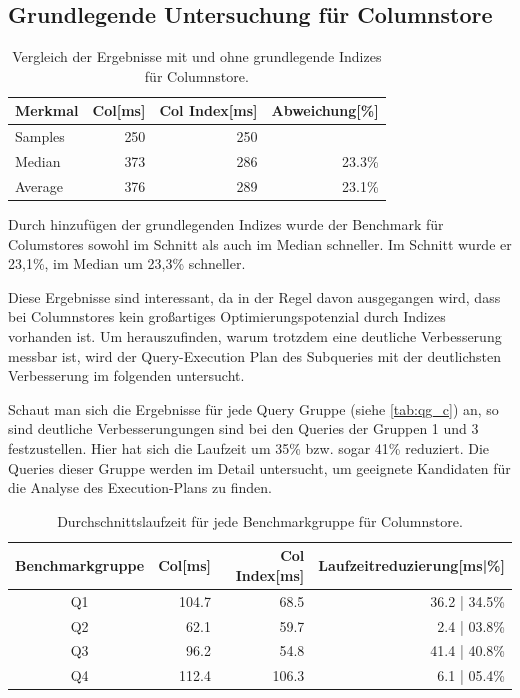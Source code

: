 \subsection{Grundlegende Untersuchung für Columnstore}
\begin{table}[H]
\centering
    \begin{tabularx}{\textwidth}{lrrr}
        \toprule
        Merkmal             &   Col[ms]    &    Col Index[ms] & Abweichung[\%]\\
        \toprule
        Samples             &   250        &   250      &       \\
        \midrule    
        Median              &   373        &   286      & 23.3\%\\
        Average             &   376        &   289      & 23.1\%\\
        \bottomrule
    \end{tabularx}
\caption{Vergleich der Ergebnisse mit und ohne grundlegende Indizes für Columnstore.}
\label{tab:basic_index_col}
\end{table}

Durch hinzufügen der grundlegenden Indizes wurde der Benchmark
für Columstores sowohl im Schnitt als auch im Median schneller.
Im Schnitt wurde er 23,1\%, im Median um 23,3\% schneller.

Diese Ergebnisse sind interessant, da in der Regel davon ausgegangen wird, 
dass bei Columnstores kein großartiges Optimierungspotenzial durch Indizes vorhanden ist.
Um herauszufinden, warum trotzdem eine deutliche Verbesserung messbar ist,
wird der Query-Execution Plan des Subqueries mit der deutlichsten Verbesserung
im folgenden untersucht.

Schaut man sich die Ergebnisse für jede Query Gruppe (siehe \autoref{tab:qg_c}) an, so sind 
deutliche Verbesserungungen sind bei den Queries der Gruppen 1 und 3 festzustellen. 
Hier hat sich die Laufzeit um 35\% bzw. sogar 41\% reduziert. 
Die Queries dieser Gruppe werden im Detail untersucht, um geeignete Kandidaten 
für die Analyse des Execution-Plans zu finden.

\begin{table}[H]
    \centering
    \begin{tabularx}{\linewidth}{crrr}
        \toprule
        Benchmarkgruppe & Col[ms]   & Col Index[ms] & Laufzeitreduzierung[ms|\%]\\
        \toprule
        Q1              & 104.7       & 68.5            & 36.2 | 34.5\%\\
        Q2              & 62.1        & 59.7            & 2.4 |  03.8\%\\
        Q3              & 96.2        & 54.8            & 41.4 | 40.8\%\\
        Q4              & 112.4       & 106.3           & 6.1 |  05.4\%\\
        \bottomrule
    \end{tabularx}
	\caption{Durchschnittslaufzeit für jede Benchmarkgruppe für Columnstore.}
    \label{tab:qg_c}
\end{table}

